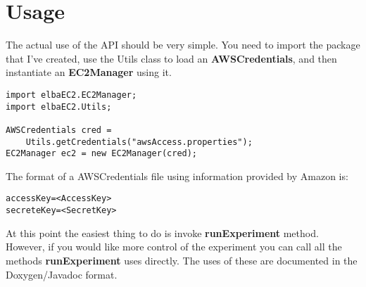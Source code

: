\documentclass[]{article}
\begin{document}
\section{Usage}
The actual use of the API should be very simple. You need to import the package that I've created, use the Utils class to load an \textbf{AWSCredentials}, and then instantiate an \textbf{EC2Manager} using it.
\begin{lstlisting}[frame=single]
import elbaEC2.EC2Manager;
import elbaEC2.Utils;

AWSCredentials cred = 
	Utils.getCredentials("awsAccess.properties");
EC2Manager ec2 = new EC2Manager(cred);
\end{lstlisting}

The format of a AWSCredentials file using information provided by Amazon is:
\begin{lstlisting}[frame=single]
accessKey=<AccessKey>
secreteKey=<SecretKey>
\end{lstlisting}

At this point the easiest thing to do is invoke \textbf{runExperiment} method. However, if you would like more control of the experiment you can call all the methods \textbf{runExperiment} uses directly. The uses of these are documented in the Doxygen/Javadoc format.
\end{document}
